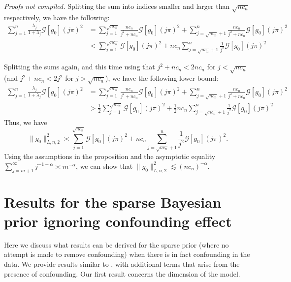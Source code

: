 \documentclass[11pt]{article}
\renewenvironment{proof}[1]{\par\noindent{\bf #1 \ }}{\hfill\BlackBox\\[2mm]}
\renewenvironment{proof}[1]{\textit{Proofs not compiled.}}{}
\begin{document}
\begin{proof}{Proof of Proposition \ref{prop:g0_control_FDBM}}
Splitting the sum into indices smaller and larger than $\sqrt{nc_n}$ respectively, we have the following:
\begin{align*}
	\sum_{j = 1}^n\frac{\lambda_j}{1+\lambda_j} \mathcal{G}[g_0](j \pi)^2 &= \sum_{j = 1}^{\sqrt{nc_n}} \frac{n c_n}{j^2 + nc_n} \mathcal{G}[g_0](j \pi)^2 + \sum_{j = \sqrt{nc_n} + 1}^{n} \frac{n c_n}{j^2 + nc_n} \mathcal{G}[g_0](j \pi)^2\\
&< \sum_{j = 1}^{\sqrt{nc_n}}  \mathcal{G}[g_0](j \pi)^2 + n c_n \sum_{j = \sqrt{nc_n} + 1}^{n} \frac{1}{j^2 } \mathcal{G}[g_0](j \pi)^2
\end{align*}

Splitting the sums again, and this time using that $j^2 + nc_n < 2nc_n$ for $j < \sqrt{nc_n}$ (and $j^2 + nc_n < 2j^2$ for $j > \sqrt{nc_n}$), we have the following lower bound:
\begin{align*}
	\sum_{j = 1}^n\frac{\lambda_j}{1+\lambda_j} \mathcal{G}[g_0](j \pi)^2 &= \sum_{j = 1}^{\sqrt{nc_n}} \frac{n c_n}{j^2 + nc_n} \mathcal{G}[g_0](j \pi)^2 + \sum_{j = \sqrt{nc_n} + 1}^{n} \frac{n c_n}{j^2 + nc_n} \mathcal{G}[g_0](j \pi)^2\\
&> \frac{1}{2} \sum_{j = 1}^{\sqrt{nc_n}}  \mathcal{G}[g_0](j \pi)^2 + \frac{1}{2} n c_n \sum_{j = \sqrt{nc_n} + 1}^{n} \frac{1}{j^2 } \mathcal{G}[g_0](j \pi)^2
\end{align*}
Thus, we have
$$
\|g_0\|_{L, n, 2}^2 \asymp \sum_{j = 1}^{\sqrt{nc_n}}  \mathcal{G}[g_0](j \pi)^2 + n c_n \sum_{j = \sqrt{nc_n} + 1}^{n} \frac{1}{j^2 } \mathcal{G}[g_0](j \pi)^2.
$$
Using the assumptions in the proposition and the asymptotic equality $\sum_{j = m + 1}^\infty j^{-1-\alpha} \asymp m^{-\alpha}$, we can show that $\|g_0\|_{L, n, 2}^2 \lesssim (nc_n)^{-\alpha}$.	
\end{proof}

\section{Results for the sparse Bayesian prior ignoring confounding effect}
Here we discuss what results can be derived for the sparse prior (where no attempt is made to remove confounding) when there is in fact confounding in the data. We provide results similar to \cite{CS-HV2015}, with additional terms that arise from the presence of confounding. Our first result concerns the dimension of the model.
\end{document}
